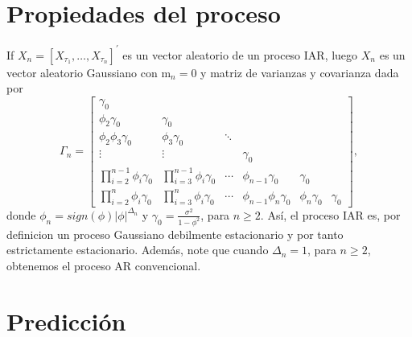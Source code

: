\section{Propiedades del proceso}
If $X_n=\left[X_{\tau_1}, \ldots, X_{\tau_n}\right]^{\prime}$ es un vector aleatorio de un proceso IAR, 
luego $X_n$ es un vector aleatorio Gaussiano con $\mathrm{m}_n=0$ y matriz de varianzas y covarianza
dada por
$$
\Gamma_n=\left[\begin{array}{cccccc}
\gamma_0 & & & & & \\
\phi_2 \gamma_0 & \gamma_0 & & & & \\
\phi_2\phi_3 \gamma_0 & \phi_3\gamma_0 & \ddots & & & \\
\vdots & \vdots & & \gamma_0 & & \\
\prod_{i=2}^{n-1}\phi_i \gamma_0 & \prod_{i=3}^{n-1}\phi_i \gamma_0 & \cdots & \phi_{n-1}\gamma_0 & \gamma_0 & \\
\prod_{i=2}^{n}\phi_i  \gamma_0 & \prod_{i=3}^{n}\phi_i  \gamma_0 & \cdots & \phi_{n-1}\phi_{n}\gamma_0 & \phi_{n}\gamma_0 & \gamma_0
\end{array}\right],
$$
donde $\phi_{n} = sign(\phi)|\phi|^{\Delta_{n}}$ y $\gamma_0=\frac{\sigma^2}{1-\phi^2}$, para $n \geq 2$. Así,
el proceso IAR es, por definicion un proceso Gaussiano debilmente estacionario y por tanto estrictamente estacionario.
Además, note que cuando $\Delta_n=1$, para $n \geq 2$, obtenemos el proceso AR convencional.

\section{Predicción}

